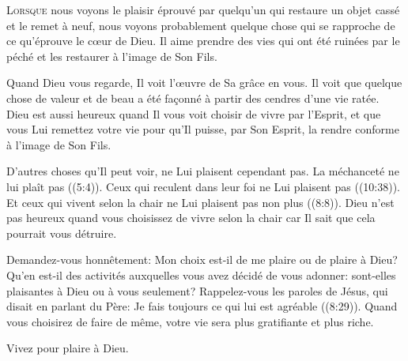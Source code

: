 



\lettrine{L}{orsque} nous voyons le plaisir éprouvé par quelqu'un
 qui restaure un objet cassé et le remet à neuf,
 nous voyons probablement quelque chose qui se rapproche de ce
 qu'éprouve le c\oe{}ur de Dieu.
 Il aime prendre des vies qui ont été ruinées par le péché
 et les restaurer à l'image de Son Fils. 

Quand Dieu vous regarde, Il voit l'\oe{}uvre de Sa grâce en vous.
 Il voit que quelque chose de valeur et de beau
 a été façonné à partir des cendres d'une vie ratée.
 Dieu est aussi heureux quand Il vous voit choisir de vivre par l'Esprit,
 et que vous Lui remettez votre vie pour qu'Il puisse, par Son Esprit,
 la rendre conforme à l'image de Son Fils. 


D'autres choses qu'Il peut voir, ne Lui plaisent cependant pas.
 La méchanceté ne lui plaît pas ((5:4)).
 Ceux qui reculent dans leur foi ne Lui plaisent pas ((10:38)).
 Et ceux qui vivent selon la chair ne Lui plaisent pas non plus
 ((8:8)).
 Dieu n'est pas heureux quand vous choisissez de vivre selon la chair
 car Il sait que cela pourrait vous détruire. 

Demandez-vous honnêtement:
 Mon choix est-il de me plaire ou de plaire à Dieu?
 Qu'en est-il des activités auxquelles vous avez décidé de vous adonner:
 sont-elles plaisantes à Dieu ou à vous seulement?
 Rappelez-vous les paroles de Jésus, qui disait en parlant du Père:
 \Og Je fais toujours ce qui lui est agréable \Fg{} ((8:29)).
 Quand vous choisirez de faire de même,
 votre vie sera plus gratifiante et plus riche. 

Vivez pour plaire à Dieu. 

\dvrule





